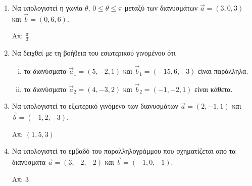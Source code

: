 





\begin{center}
\end{center}

\vspace{\baselineskip}

\begin{enumerate}
	\item Να υπολογιστεί η γωνία $ \theta $, $ 0\leq \theta \leq \pi $ μεταξύ των διανυσμάτων $
		\vec{a} = (3,0,3) $ και $ \vec{b} = (0,6,6) $.

		\hfill Απ: $ \frac{\pi}{3} $

	\item Να δειχθεί με τη βοήθεια του εσωτερικού γινομένου ότι
		\begin{enumerate}[i)]
			\item τα διανύσματα $ \vec{a}_1 = (5,-2,1) $ και $ \vec{b}_1 = (-15,6,-3) $ είναι παράλληλα.
			\item τα διανύσματα $ \vec{a}_2 = (4,-3,2) $ και $ \vec{b}_2 = (-1,-2,1) $ είναι κάθετα.
		\end{enumerate}

	\item Να υπολογιστεί το εξωτερικό γινόμενο των διανυσμάτων $ \vec{a} = (2,-1,1) $ και $ \vec{b} = (-1,2,-3) $.

		\hfill Απ: $ (1,5,3) $

	\item Να υπολογιστεί το εμβαδό του παραλληλογράμμου που σχηματίζεται από τα διανύσματα $ \vec{a} = (3,-2,-2) $ και $ \vec{b} = (-1,0,-1) $.

		\hfill Απ: $3 $ 
\end{enumerate}


